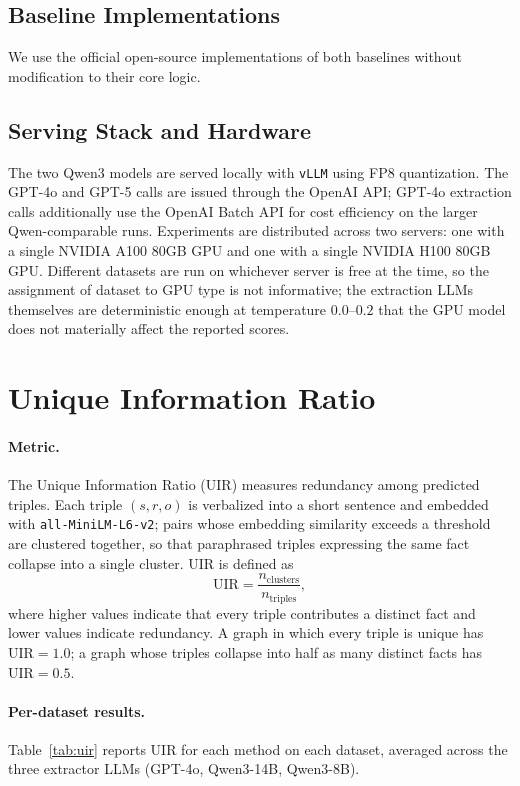 \documentclass[11pt]{article}
\begin{document}
\subsection{Baseline Implementations}
\label{app:baselines}

We use the official open-source implementations of both baselines without modification to their core logic. 

\subsection{Serving Stack and Hardware}
\label{app:serving_stack}

The two Qwen3 models are served locally with \texttt{vLLM} using FP8 quantization. The GPT-4o and GPT-5 calls are issued through the OpenAI API; GPT-4o extraction calls additionally use the OpenAI Batch API for cost efficiency on the larger Qwen-comparable runs. Experiments are distributed across two servers: one with a single NVIDIA A100 80GB GPU and one with a single NVIDIA H100 80GB GPU. Different datasets are run on whichever server is free at the time, so the assignment of dataset to GPU type is not informative; the extraction LLMs themselves are deterministic enough at temperature $0.0$--$0.2$ that the GPU model does not materially affect the reported scores.


\section{Unique Information Ratio}
\label{app:uir}

\paragraph{Metric.} The Unique Information Ratio (UIR) measures redundancy among predicted triples. Each triple $(s, r, o)$ is verbalized into a short sentence and embedded with \texttt{all-MiniLM-L6-v2}; pairs whose embedding similarity exceeds a threshold are clustered together, so that paraphrased triples expressing the same fact collapse into a single cluster. UIR is defined as
\[
\mathrm{UIR} = \frac{n_{\text{clusters}}}{n_{\text{triples}}},
\]
where higher values indicate that every triple contributes a distinct fact and lower values indicate redundancy. A graph in which every triple is unique has $\mathrm{UIR}=1.0$; a graph whose triples collapse into half as many distinct facts has $\mathrm{UIR}=0.5$.

\paragraph{Per-dataset results.} Table~\ref{tab:uir} reports UIR for each method on each dataset, averaged across the three extractor LLMs (GPT-4o, Qwen3-14B, Qwen3-8B).
\end{document}
